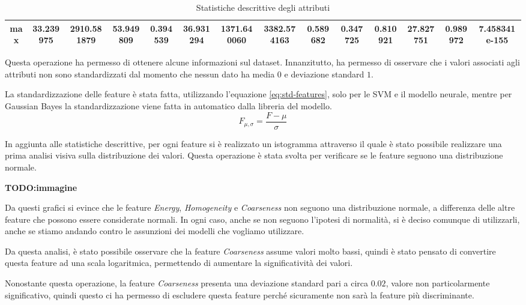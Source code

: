 \begin{table}[!ht]
{\begin{tabular}{|c|c|c|c|c|c|c|c|c|c|c|c|c|c|}
            \textbf{max}   & 33.239975     & 2910.581879       & 53.949809                   & 0.394539         & 36.931294         & 1371.640060       & 3382.574163       & 0.589682        & 0.347725     & 0.810921             & 27.827751              & 0.989972             & 7.458341e-155       \\ \hline
        \end{tabular}}
    \caption{Statistiche descrittive degli attributi}
    \label{tab:desc-stat}
\end{table}

Questa operazione ha permesso di ottenere alcune informazioni sul dataset.
Innanzitutto, ha permesso di osservare che i valori associati agli attributi non
sono standardizzati dal momento che nessun dato ha media $0$ e deviazione
standard $1$.

La standardizzazione delle feature è stata fatta, utilizzando l'equazione
\ref{eq:std-features}, solo per le SVM e il modello neurale, mentre per Gaussian
Bayes la standardizzazione viene fatta in automatico dalla libreria del modello.
\begin{equation}
    F_{\mu, \sigma} = \frac{F - \mu}{\sigma}
    \label{eq:std-features}
\end{equation}

In aggiunta alle statistiche descrittive, per ogni feature si è realizzato un
istogramma attraverso il quale è stato possibile realizzare una prima analisi
visiva sulla distribuzione dei valori. Questa operazione è stata svolta per
verificare se le feature seguono una distribuzione normale.

\textbf{TODO:immagine}

Da questi grafici si evince che le feature \textit{Energy}, \textit{Homogeneity}
e \textit{Coarseness} non seguono una distribuzione normale, a differenza delle
altre feature che possono essere considerate normali. In ogni caso, anche se non
seguono l'ipotesi di normalità, si è deciso comunque di utilizzarli, anche se
stiamo andando contro le assunzioni dei modelli che vogliamo utilizzare. %

Da questa analisi, è stato possibile osservare che la feature \textit{Coarseness}
assume valori molto bassi, quindi è stato pensato di convertire questa feature
ad una scala logaritmica, permettendo di aumentare la significatività dei valori.

Nonostante questa operazione, la feature \textit{Coarseness} presenta una deviazione
standard pari a circa $0.02$, valore non particolarmente significativo, quindi
questo ci ha permesso di escludere questa feature perché sicuramente non sarà la
feature più discriminante.


